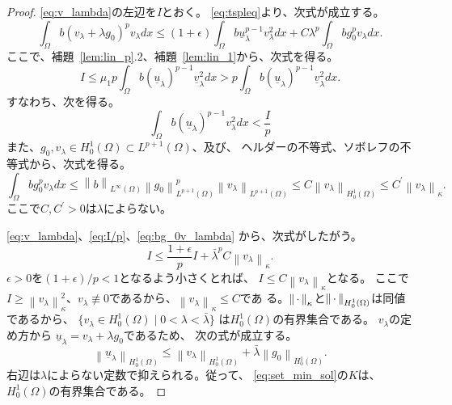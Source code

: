 \begin{proof}
 \eqref{eq:v_lambda}の左辺を$I$とおく。
 \eqref{eq:tspleq}より、次式が成立する。
 \begin{equation}
  \int_\Omega b (v_\lambda + \lambda g_0)^p v_\lambda dx 
   \leq (1 + \epsilon) \int_\Omega b \underline{u}_\lambda ^{p-1}
   v_\lambda^2 dx + C \lambda^p \int_\Omega bg_0^p v_\lambda dx.
   \label{eq:v_lambda_I}
 \end{equation}
 ここで、補題~\ref{lem:lin_p}.2、補題~\ref{lem:lin_1}から、次式を得る。
 \[
  I \leq \mu_1 p \int_\Omega b (\underline{u}_\lambda)^{p-1}
 \underline{v}_\lambda^2 dx > p \int_\Omega b (\underline{u}_\lambda)^{p-1}
 \underline{v}_\lambda^2 dx.
 \]
 すなわち、次を得る。
 \begin{equation}
  \int_\Omega b(\underline{u}_\lambda)^{p-1} v_\lambda^2 dx <
   \frac{I}{p} \label{eq:I/p}
 \end{equation}
 また、$g_0, v_\lambda \in H_0^1(\Omega) \subset L^{p+1}(\Omega)$、及び、
 ヘルダーの不等式、ソボレフの不等式から、次式を得る。
 \begin{equation}
  \int_\Omega b g_0^p v_\lambda dx \leq 
   \left\| b  \right\|_{L^\infty(\Omega)}
   \left\| g_0 \right\|_{L^{p+1}(\Omega)}^p 
   \left\| v_\lambda \right\|_{L^{p+1}(\Omega)}
   \leq C \left\| v_\lambda \right\|_{H_0^1(\Omega)}
   \leq C^\prime \left\| v_\lambda \right\|_{\kappa}.
   \label{eq:bg_0v_lambda}
 \end{equation}
 ここで$C, C^\prime > 0$は$\lambda$によらない。

 \eqref{eq:v_lambda}、\eqref{eq:I/p}、\eqref{eq:bg_0v_lambda}
 から、次式がしたがう。
 \[
  I \leq \frac{1 + \epsilon}{p} I + \bar{\lambda}^p C \left\|
 v_\lambda \right\|_{\kappa}.
 \]
 $\epsilon > 0$を$(1+\epsilon)/p < 1$となるよう小さくとれば、
 $I \leq C \left\| v_\lambda \right\|_\kappa$となる。
 ここで$I \geq \left\| v_\lambda \right\|_\kappa^2$、$v_\lambda \not
 \equiv 0$であるから、$\left\| v_\lambda \right\|_{\kappa} \leq C$であ
 る。$\left\|\, \cdot \, \right\|_\kappa$と$\left\|\, \cdot \, \right\|_{H_0^1(\Omega)}$は同値であるから、
 $\{ v_\lambda \in H_0^1(\Omega) \mid 0 < \lambda < \bar{\lambda} \}$
 は$H_0^1(\Omega)$の有界集合である。
 $v_\lambda$の定め方から
 $\underline{u}_\lambda = v_\lambda + \lambda g_0$であるため、
 次の式が成立する。
 \[
  \left\| \underline{u}_\lambda \right\|_{H_0^1(\Omega)} 
 \leq \left\| v_\lambda \right\|_{H_0^1(\Omega)}
 + \bar{\lambda} \left\| g_0 \right\|_{H_0^1(\Omega)}.
 \]
 右辺は$\lambda$によらない定数で抑えられる。従って、
 \eqref{eq:set_min_sol}の$K$は、$H_0^1(\Omega)$の有界集合である。\qedhere
\end{proof}

